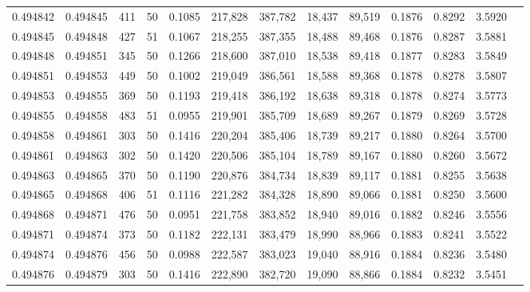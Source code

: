\begin{tabular}{rrrrrrrrrrrrr}
0.494842 & 0.494845 &   411 &  50 &                                     0.1085 & 217,828 & 387,782 &  18,437 &  89,519 & 0.1876 & 0.8292 & 3.5920 \\
0.494845 & 0.494848 &   427 &  51 &                                     0.1067 & 218,255 & 387,355 &  18,488 &  89,468 & 0.1876 & 0.8287 & 3.5881 \\
0.494848 & 0.494851 &   345 &  50 &                                     0.1266 & 218,600 & 387,010 &  18,538 &  89,418 & 0.1877 & 0.8283 & 3.5849 \\
0.494851 & 0.494853 &   449 &  50 &                                     0.1002 & 219,049 & 386,561 &  18,588 &  89,368 & 0.1878 & 0.8278 & 3.5807 \\
0.494853 & 0.494855 &   369 &  50 &                                     0.1193 & 219,418 & 386,192 &  18,638 &  89,318 & 0.1878 & 0.8274 & 3.5773 \\
0.494855 & 0.494858 &   483 &  51 &                                     0.0955 & 219,901 & 385,709 &  18,689 &  89,267 & 0.1879 & 0.8269 & 3.5728 \\
0.494858 & 0.494861 &   303 &  50 &                                     0.1416 & 220,204 & 385,406 &  18,739 &  89,217 & 0.1880 & 0.8264 & 3.5700 \\
0.494861 & 0.494863 &   302 &  50 &                                     0.1420 & 220,506 & 385,104 &  18,789 &  89,167 & 0.1880 & 0.8260 & 3.5672 \\
0.494863 & 0.494865 &   370 &  50 &                                     0.1190 & 220,876 & 384,734 &  18,839 &  89,117 & 0.1881 & 0.8255 & 3.5638 \\
0.494865 & 0.494868 &   406 &  51 &                                     0.1116 & 221,282 & 384,328 &  18,890 &  89,066 & 0.1881 & 0.8250 & 3.5600 \\
0.494868 & 0.494871 &   476 &  50 &                                     0.0951 & 221,758 & 383,852 &  18,940 &  89,016 & 0.1882 & 0.8246 & 3.5556 \\
0.494871 & 0.494874 &   373 &  50 &                                     0.1182 & 222,131 & 383,479 &  18,990 &  88,966 & 0.1883 & 0.8241 & 3.5522 \\
0.494874 & 0.494876 &   456 &  50 &                                     0.0988 & 222,587 & 383,023 &  19,040 &  88,916 & 0.1884 & 0.8236 & 3.5480 \\
0.494876 & 0.494879 &   303 &  50 &                                     0.1416 & 222,890 & 382,720 &  19,090 &  88,866 & 0.1884 & 0.8232 & 3.5451 \\

\end{tabular}
